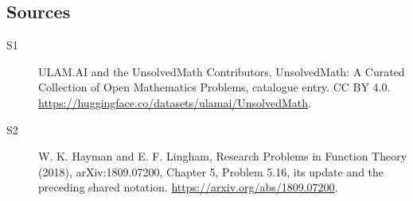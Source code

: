 \documentclass[11pt]{article}
\begin{document}
\subsection{Sources}
\begin{description}
\item[\hypertarget{source:statement:1}{S1}] ULAM.AI and the UnsolvedMath Contributors, UnsolvedMath: A Curated Collection of Open Mathematics Problems, catalogue entry. CC BY 4.0. \url{https://huggingface.co/datasets/ulamai/UnsolvedMath}.
\item[\hypertarget{source:statement:2}{S2}] W. K. Hayman and E. F. Lingham, Research Problems in Function Theory (2018), arXiv:1809.07200, Chapter 5, Problem 5.16, its update and the preceding shared notation. \url{https://arxiv.org/abs/1809.07200}.
\end{description}
\label{end:statement}
\end{document}
